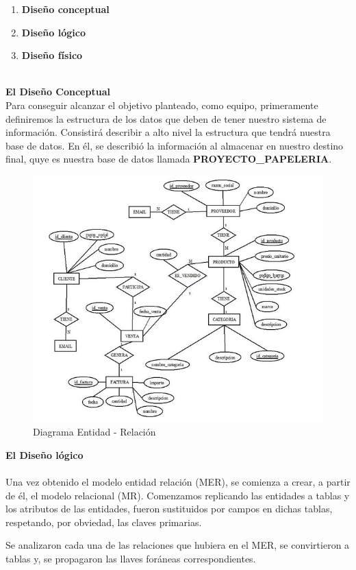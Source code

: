 \documentclass[10pt]{report}
\begin{document}
\begin{enumerate}
    \item \textbf{Diseño conceptual}
    \item \textbf{Diseño lógico }
    \item \textbf{Diseño físico}\\ \\
\end{enumerate}

\textbf{El Diseño Conceptual}\\
\setlength{\parskip}{10mm}
Para conseguir alcanzar el objetivo planteado, como equipo, primeramente definiremos la estructura de los datos que deben de tener nuestro sistema de información. 
Consistirá describir a alto nivel  la estructura que tendrá nuestra base de datos. En él, se describió la información al almacenar en nuestro destino final, quye es nuestra base de datos llamada \textbf{PROYECTO\_PAPELERIA}. 
    
    \begin{figure}[htb]
    \centering
    \includegraphics[width=0.8\linewidth]{DER.png}
    \caption{Diagrama Entidad - Relación}
    \end{figure}

\textbf{El Diseño lógico\\ \\}
\setlength{\parskip}{0mm}
Una vez obtenido el modelo entidad relación (MER), se comienza a crear, a partir de él, el modelo relacional (MR). Comenzamos replicando las entidades a tablas y los atributos de las entidades, fueron sustituidos por campos en dichas tablas, respetando, por obviedad, las claves primarias.

Se analizaron cada una de las relaciones que hubiera en el MER, se convirtieron a tablas y, se propagaron las llaves foráneas correspondientes.
\end{document}
